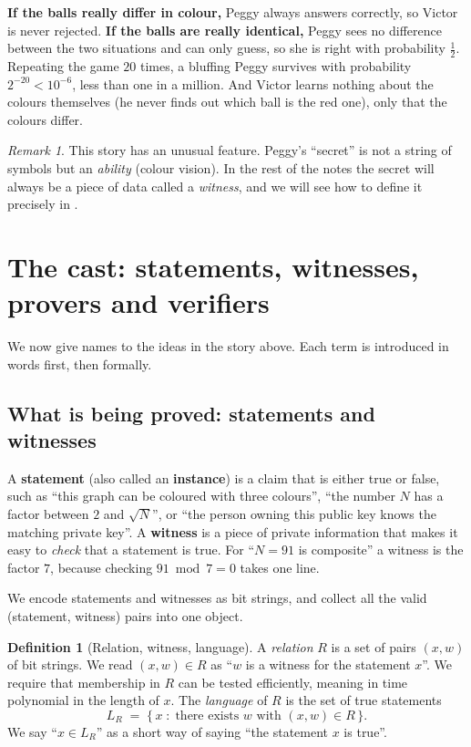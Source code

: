\documentclass[11pt,a4paper]{report}
\theoremstyle{plain}
\theoremstyle{definition}
\newtheorem{definition}[theorem]{Definition}
\theoremstyle{remark}
\newtheorem{remark}[theorem]{Remark}
\begin{document}
\textbf{If the balls really differ in colour,} Peggy always answers correctly, so Victor is never rejected.
\textbf{If the balls are really identical,} Peggy sees no difference between the two situations and can only guess, so she is right with probability $\tfrac12$.
Repeating the game $20$ times, a bluffing Peggy survives with probability $2^{-20}<10^{-6}$, less than one in a million.
And Victor learns nothing about the colours themselves (he never finds out which ball is the red one), only that the colours differ.

\begin{remark}
This story has an unusual feature. Peggy's ``secret'' is not a string of symbols but an \emph{ability} (colour vision).
In the rest of the notes the secret will always be a piece of data called a \emph{witness}, and we will see how to define
it precisely in .
\end{remark}

\section{The cast: statements, witnesses, provers and verifiers}\label{sec:cast}
We now give names to the ideas in the story above. Each term is introduced in words first, then formally.

\subsection{What is being proved: statements and witnesses}\label{sec:witness}
A \textbf{statement} (also called an \textbf{instance}) is a claim that is either true or false, such as
``this graph can be coloured with three colours'', ``the number $N$ has a factor between $2$ and $\sqrt N$'', or ``the person owning this public key knows the matching private key''.
A \textbf{witness} is a piece of private information that makes it easy to \emph{check} that a statement is true.
For ``$N=91$ is composite'' a witness is the factor $7$, because checking $91 \bmod 7 = 0$ takes one line.

We encode statements and witnesses as bit strings, and collect all the valid (statement, witness) pairs into one object.

\begin{definition}[Relation, witness, language]\label{def:intro-relation}
A \emph{relation} $R$ is a set of pairs $(x,w)$ of bit strings. We read $(x,w)\in R$ as ``$w$ is a witness for the statement $x$''.
We require that membership in $R$ can be tested efficiently, meaning in time polynomial in the length of $x$.
The \emph{language} of $R$ is the set of true statements
\[
 L_R \;=\; \{\,x \;:\; \text{there exists } w \text{ with } (x,w)\in R\,\}.
\]
We say ``$x\in L_R$'' as a short way of saying ``the statement $x$ is true''.
\end{definition}
\end{document}
